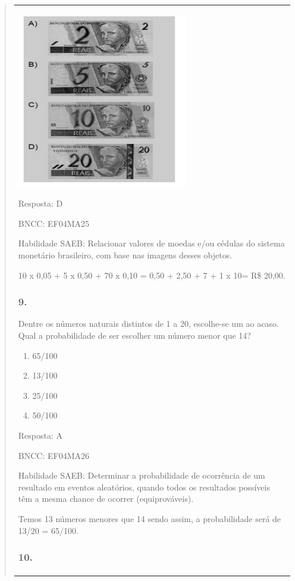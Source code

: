 \begin{enumerate}
\begin{escolha}
\begin{enumerate}
\begin{itemize}
\begin{itemize}
\begin{escolha}
\begin{quote}
\begin{escolha}
{\begin{longtable}[]{@{}l@{}}
\begin{itemize}
\includegraphics[width=2.93590in,height=3.00930in]{media/image168.png}

Resposta: D

BNCC: EF04MA25

Habilidade SAEB: Relacionar valores de moedas e/ou cédulas do sistema
monetário brasileiro, com base nas imagens desses objetos.

10 x 0,05 + 5 x 0,50 + 70 x 0,10 = 0,50 + 2,50 + 7 + 1 x 10= R\$ 20,00.

\subsubsection{9.}\label{section-195}

Dentre os números naturais distintos de 1 a 20, escolhe-se um ao acaso.
Qual a probabilidade de ser escolher um número menor que 14?

\begin{enumerate}
\def\labelenumi{\alph{enumi})}
\item
  65/100
\item
  13/100
\item
  25/100
\item
  50/100
\end{enumerate}

Resposta: A

BNCC: EF04MA26

Habilidade SAEB: Determinar a probabilidade de ocorrência de um
resultado em eventos aleatórios, quando todos os resultados possíveis
têm a mesma chance de ocorrer (equiprováveis).

Temos 13 números menores que 14 sendo assim, a probabilidade será de
13/20 = 65/100.

\subsubsection{10.}\label{section-196}


\end{itemize}
\end{longtable}}
\end{escolha}
\end{quote}
\end{escolha}
\end{itemize}
\end{itemize}
\end{enumerate}
\end{escolha}
\end{enumerate}
